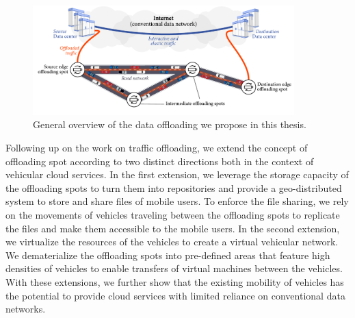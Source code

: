 \begin{figure}[t]
    \centering
    \includegraphics[width=0.9\textwidth]{figures/architecture-2.pdf}
    \caption{General overview of the data offloading we propose in this thesis.}
    \label{fig:offloading-service-architecture}
\end{figure}

Following up on the work on traffic offloading, we extend the concept of offloading spot according to two distinct directions both in the context of vehicular cloud services. In the first extension, we leverage the storage capacity of the offloading spots to turn them into repositories and provide a geo-distributed system to store and share files of mobile users. To enforce the file sharing, we rely on the movements of vehicles traveling between the offloading spots to replicate the files and make them accessible to the mobile users. In the second extension, we virtualize the resources of the vehicles to create a virtual vehicular network. We dematerialize the offloading spots into pre-defined areas that feature high densities of vehicles to enable transfers of virtual machines between the vehicles. With these extensions, we further show that the existing mobility of vehicles has the potential to provide cloud services with limited reliance on conventional data networks.


